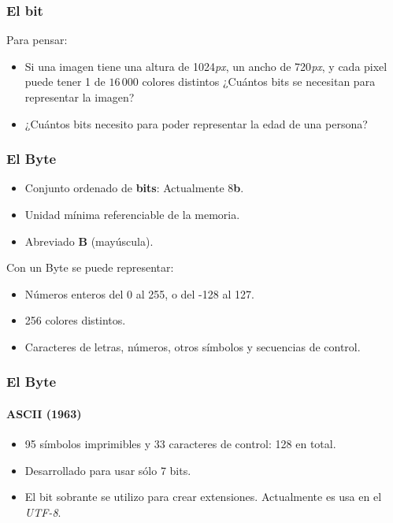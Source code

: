 \documentclass[11pt,a4paper,spanish]{beamer}
\newcommand{\bit}{\textbf{b}}
\newcommand{\Byte}{\textbf{B}}
\begin{document}
\begin{frame}
\frametitle{El bit}

Para pensar:

\begin{itemize}
    \item Si una imagen tiene una altura de 1024\emph{px}, un ancho de
        720\emph{px}, y cada pixel puede tener 1 de $16\,000$ colores
        distintos ¿Cuántos bits se necesitan para representar la imagen?
    \item ¿Cuántos bits necesito para poder representar la edad de una
        persona?
\end{itemize}

\end{frame}

\begin{frame}

\frametitle{El Byte}

    \begin{itemize}
        \item Conjunto ordenado de \textbf{bits}: Actualmente 8\bit.
        \item Unidad mínima referenciable de la memoria.
        \item Abreviado \Byte{} (mayúscula).
    \end{itemize}
    \pause

    Con un Byte se puede representar:

    \begin{itemize}
        \item Números enteros del 0 al 255, o del -128 al 127.
        \item 256 colores distintos.
        \item Caracteres de letras, números, otros símbolos y secuencias de
            control.
    \end{itemize}

\end{frame}

\begin{frame}

\frametitle{El Byte}
\framesubtitle{ASCII (1963)}

\begin{itemize}
    \item 95 símbolos imprimibles y 33 caracteres de control: 128 en total.
    \item Desarrollado para usar sólo 7 bits.
    \item El bit sobrante se utilizo para crear extensiones. Actualmente es
        usa en el \emph{UTF-8}.
\end{itemize}

\end{frame}
\end{document}
